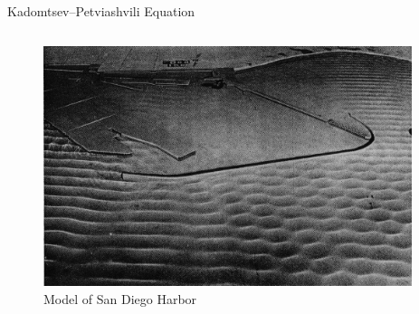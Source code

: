 \documentclass{beamer}
\begin{document}
\begin{frame}{Kadomtsev--Petviashvili Equation}{}
\begin{columns}[T]
\begin{column}{0.5\textwidth}
\begin{figure}
        \includegraphics[width=0.96\textwidth]{images/sd-harbor-model.jpg}
        \caption{Model of San Diego Harbor}
      \end{figure}
    \end{column}
  \end{columns}
\end{frame}
\end{document}
